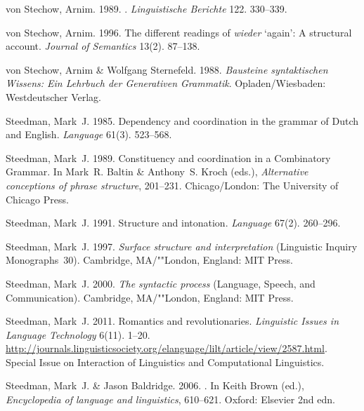 \begin{thebibliography}{1420}
von Stechow, Arnim. 1989.
.
\newblock \emph{Linguistische Berichte} 122. 330--339.

von Stechow, Arnim. 1996.
\newblock The different readings of \emph{wieder} `again': {A} structural
  account.
\newblock \emph{Journal of Semantics} 13(2). 87--138.

von Stechow, Arnim \& Wolfgang Sternefeld. 1988.
\newblock \emph{{Bausteine syntaktischen Wissens: Ein Lehrbuch der Generativen
  Grammatik}}.
\newblock Opladen/Wiesbaden: Westdeutscher Verlag.

Steedman, Mark~J. 1985.
\newblock Dependency and coordination in the grammar of {Dutch} and {English}.
\newblock \emph{Language} 61(3). 523--568.

Steedman, Mark~J. 1989.
\newblock Constituency and coordination in a {Combinatory Grammar}.
\newblock In Mark~R. Baltin \& Anthony~S. Kroch (eds.), \emph{Alternative
  conceptions of phrase structure}, 201--231. Chicago/London: The University of
  Chicago Press.

Steedman, Mark~J. 1991.
\newblock Structure and intonation.
\newblock \emph{Language} 67(2). 260--296.

Steedman, Mark~J. 1997.
\newblock \emph{Surface structure and interpretation} (Linguistic Inquiry
  Monographs~30).
\newblock Cambridge, MA/""London, England: MIT Press.

Steedman, Mark~J. 2000.
\newblock \emph{The syntactic process}  (Language, Speech, and Communication).
\newblock Cambridge, MA/""London, England: MIT Press.

Steedman, Mark~J. 2011.
\newblock Romantics and revolutionaries.
\newblock \emph{Linguistic Issues in Language Technology} 6(11). 1--20.
\newblock
  \urlprefix\url{http://journals.linguisticsociety.org/elanguage/lilt/article/view/2587.html}.
\newblock Special Issue on Interaction of Linguistics and Computational
  Linguistics.

Steedman, Mark~J. \& Jason Baldridge. 2006.
.
\newblock In Keith Brown (ed.), \emph{Encyclopedia of language and
  linguistics}, 610--621. Oxford: Elsevier 2nd edn.


\end{thebibliography}
